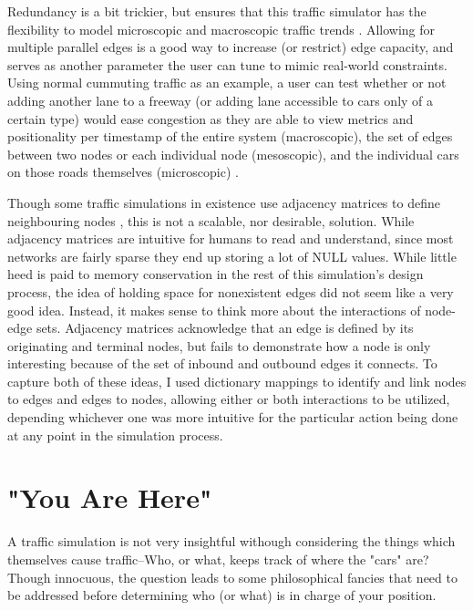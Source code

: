 \par Redundancy is a bit trickier, but ensures that this traffic simulator has the flexibility to model microscopic and macroscopic traffic trends \cite{LWB18}.  Allowing for multiple parallel edges is a good way to increase (or restrict) edge capacity, and serves as another parameter the user can tune to mimic real-world constraints.  Using normal cummuting traffic as an example, a user can test whether or not adding another lane to a freeway (or adding lane accessible to cars only of a certain type) would ease congestion as they are able to view metrics and positionality per timestamp of the entire system (macroscopic), the set of edges between two nodes or each individual node (mesoscopic), and the individual cars on those roads themselves (microscopic) \cite{LWB18}. \\


\par Though some traffic simulations in existence use adjacency matrices to define neighbouring nodes \cite{GPK02}, this is not a scalable, nor desirable, solution.  While adjacency matrices are intuitive for humans to read and understand, since most networks are fairly sparse they end up storing a lot of NULL values.  While little heed is paid to memory conservation in the rest of this simulation's design process, the idea of holding space for nonexistent edges did not seem like a very good idea.  Instead, it makes sense to think more about the interactions of node-edge sets.  Adjacency matrices acknowledge that an edge is defined by its originating and terminal nodes, but fails to demonstrate how a node is only interesting because of the set of inbound and outbound edges it connects.  To capture both of these ideas, I used dictionary mappings to identify and link nodes to edges and edges to nodes, allowing either or both interactions to be utilized, depending whichever one was more intuitive for the particular action being done at any point in the simulation process.\\


\section{"You Are Here"}

\par A traffic simulation is not very insightful withough considering the things which themselves cause traffic--Who, or what, keeps track of where the "cars" are?  Though innocuous, the question leads to some philosophical fancies that need to be addressed before determining who (or what) is in charge of your position. \\

